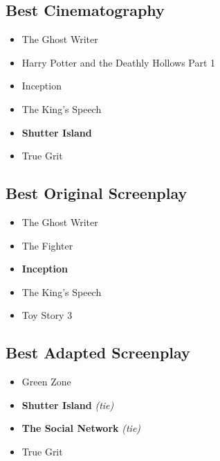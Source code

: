 \documentclass{article}
\begin{document}
\begin{multicols}{2}
\subsection*{Best Cinematography}
  \begin{itemize}
    \setlength{\parskip}{0pt}
    \setlength{\itemsep}{0pt}
    \item[] The Ghost Writer
    \item[] Harry Potter and the Deathly Hollows Part 1
    \item[] Inception
    \item[] The King's Speech
    \item \textbf{Shutter Island}
    \item[] True Grit
  \end{itemize}

\subsection*{Best Original Screenplay}
  \begin{itemize}
    \setlength{\parskip}{0pt}
    \setlength{\itemsep}{0pt}
    \item[] The Ghost Writer
    \item[] The Fighter
    \item \textbf{Inception}
    \item[] The King's Speech
    \item[] Toy Story 3
  \end{itemize}

\subsection*{Best Adapted Screenplay}
  \begin{itemize}
    \setlength{\parskip}{0pt}
    \setlength{\itemsep}{0pt}
    \item[] Green Zone
    \item \textbf{Shutter Island} \emph{(tie)}
    \item \textbf{The Social Network} \emph{(tie)}
    \item[] True Grit
  \end{itemize}


\end{multicols}
\end{document}
